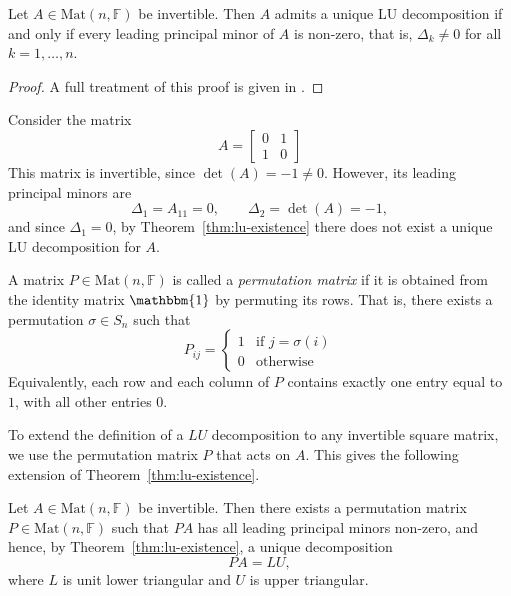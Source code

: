 		\begin{theorem}
			\label{thm:lu-existence}
			Let $A \in \text{Mat}(n, \mathbb{F})$ be invertible. Then $A$ admits a unique LU decomposition if and only if every leading principal minor of $A$ is non-zero, that is, $\Delta_k \neq 0$ for all $k = 1, \dots, n$.
		\end{theorem}
		
		\begin{proof}
			A full treatment of this proof is given in \cite[\S3.2]{GolubVanLoan2013}.
		\end{proof}
		
		\begin{example}
			\label{ex:zero-pivot}
			Consider the matrix
			\[
				A = \begin{bmatrix} 0 & 1 \\ 1 & 0 \end{bmatrix}
			\]
			This matrix is invertible, since $\det(A) = -1 \neq 0$. However, its leading principal minors are
			\[
				\Delta_1 = A_{11} = 0, \qquad \Delta_2 = \det(A) = -1,
			\]
			and since $\Delta_1 = 0$, by Theorem~\ref{thm:lu-existence} there does not exist a unique LU decomposition for $A$.
		\end{example}
		
		\begin{definition}
			\label{def:permutation-matrix}
			A matrix $P \in \mathrm{Mat}(n, \mathbb{F})$ is called a \emph{permutation matrix} if it is obtained from the identity matrix $\mathbbm{1}$ by permuting its rows. That is, there exists a permutation $\sigma \in S_n$ such that
			\[
				P_{ij} = \begin{cases} 
							1 & \text{if } j = \sigma(i) \\ 
							0 & \text{otherwise}
						\end{cases}
			\]
			Equivalently, each row and each column of $P$ contains exactly one entry equal to $1$, with all other entries $0$.
		\end{definition}
		
		\noindent To extend the definition of a $LU$ decomposition to any invertible square matrix, we use the permutation matrix $P$ that acts on $A$. This gives the following extension of Theorem~\ref{thm:lu-existence}.
		
		\begin{theorem}[Existence of the $PA=LU$ Decomposition]
			\label{thm:pa-lu-existence}
			Let $A \in \mathrm{Mat}(n, \mathbb{F})$ be invertible. Then there exists a permutation matrix $P \in \mathrm{Mat}(n, \mathbb{F})$ such that $PA$ has all leading principal minors non-zero, and hence, by Theorem~\ref{thm:lu-existence}, a unique decomposition
			\[
				PA = LU,
			\]
			where $L$ is unit lower triangular and $U$ is upper triangular.
		\end{theorem}
		
